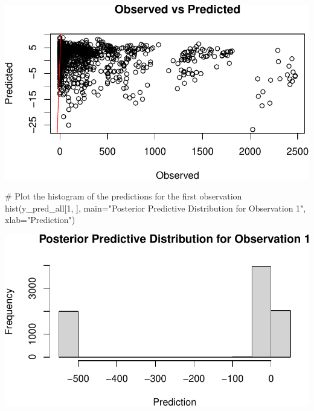 \documentclass[
  12pt,
]{article}
\newenvironment{Shaded}{\begin{snugshade}}{\end{snugshade}}
\newcommand{\AttributeTok}[1]{\textcolor[rgb]{0.40,0.45,0.13}{#1}}
\newcommand{\CommentTok}[1]{\textcolor[rgb]{0.37,0.37,0.37}{#1}}
\newcommand{\DecValTok}[1]{\textcolor[rgb]{0.68,0.00,0.00}{#1}}
\newcommand{\FunctionTok}[1]{\textcolor[rgb]{0.28,0.35,0.67}{#1}}
\newcommand{\NormalTok}[1]{\textcolor[rgb]{0.00,0.23,0.31}{#1}}
\newcommand{\OtherTok}[1]{\textcolor[rgb]{0.00,0.23,0.31}{#1}}
\newcommand{\SpecialCharTok}[1]{\textcolor[rgb]{0.37,0.37,0.37}{#1}}
\newcommand{\StringTok}[1]{\textcolor[rgb]{0.13,0.47,0.30}{#1}}
\begin{document}
\includegraphics{final_main_quarto_presentation_files/figure-pdf/unnamed-chunk-22-1.pdf}

\begin{Shaded}
\begin{Highlighting}[]
\CommentTok{\# Plot the histogram of the predictions for the first observation}
\FunctionTok{hist}\NormalTok{(y\_pred\_all[}\DecValTok{1}\NormalTok{, ], }\AttributeTok{main=}\StringTok{"Posterior Predictive Distribution for Observation 1"}\NormalTok{, }\AttributeTok{xlab=}\StringTok{"Prediction"}\NormalTok{)}
\end{Highlighting}
\end{Shaded}

\includegraphics{final_main_quarto_presentation_files/figure-pdf/unnamed-chunk-23-1.pdf}

\begin{Shaded}
\end{Shaded}
\end{document}

